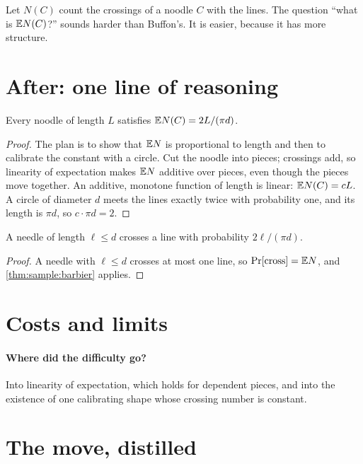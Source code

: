 \documentclass{missingbook}
\begin{document}
\begin{refsection}
Let $N(C)$ count the crossings of a noodle $C$ with the lines. The question ``what is $\mathbb{E} N(C)$?'' sounds harder than Buffon's. It is easier, because it has more structure.

\section{After: one line of reasoning}

\begin{theorem}\label{thm:sample:barbier}
Every noodle of length $L$ satisfies $\mathbb{E} N(C) = 2L/(\pi d)$.
\end{theorem}

\begin{proof}
The plan is to show that $\mathbb{E} N$ is proportional to length and then to calibrate the constant with a circle. Cut the noodle into pieces; crossings add, so linearity of expectation makes $\mathbb{E} N$ additive over pieces, even though the pieces move together. An additive, monotone function of length is linear: $\mathbb{E} N(C) = cL$. A circle of diameter $d$ meets the lines exactly twice with probability one, and its length is $\pi d$, so $c\cdot\pi d = 2$.
\end{proof}

\begin{corollary}\label{cor:sample:buffon}
A needle of length $\ell\le d$ crosses a line with probability $2\ell/(\pi d)$.
\end{corollary}

\begin{proof}
A needle with $\ell\le d$ crosses at most one line, so $\Pr[\text{cross}] = \mathbb{E} N$, and \cref{thm:sample:barbier} applies.
\end{proof}

\section{Costs and limits}

\paragraph{Where did the difficulty go?} Into linearity of expectation, which holds for dependent pieces, and into the existence of one calibrating shape whose crossing number is constant.

\section{The move, distilled}


\end{refsection}
\end{document}
